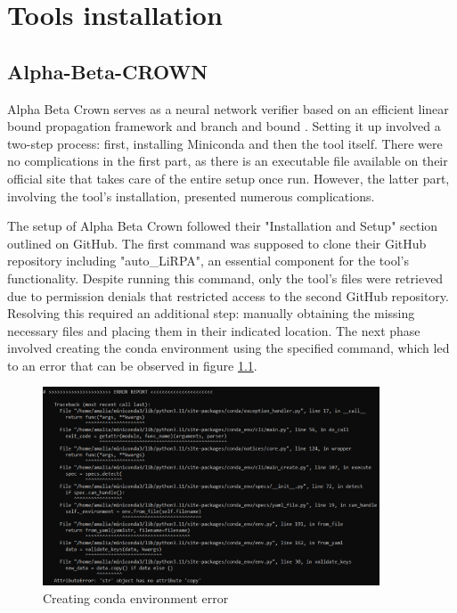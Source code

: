 \chapter{Tools installation}
\label{chap:ch2}

\section{Alpha-Beta-CROWN}
\label{sec:ch2sec1}

\par Alpha Beta Crown serves as a neural network verifier based on an efficient linear bound propagation framework and branch and bound \cite{abc}. Setting it up involved a two-step process: first, installing Miniconda and then the tool itself. There were no complications in the first part, as there is an executable file available on their official site that takes care of the entire setup once run. However, the latter part, involving the tool's installation, presented numerous complications.

\par The setup of Alpha Beta Crown followed their "Installation and Setup" section outlined on GitHub. The first command was supposed to clone their GitHub repository including "auto\_LiRPA", an essential component for the tool's functionality. Despite running this command, only the tool's files were retrieved due to permission denials that restricted access to the second GitHub repository. Resolving this required an additional step: manually obtaining the missing necessary files and placing them in their indicated location. The next phase involved creating the conda environment using the specified command, which led to an error that can be observed in figure \ref{Fig_Err}. 

\begin{figure}[htbp]
	\centering
		\includegraphics[width=10cm]{./Figures/ToolErr.png}
	\caption{Creating conda environment error}
	\label{Fig_Err}
\end{figure}

